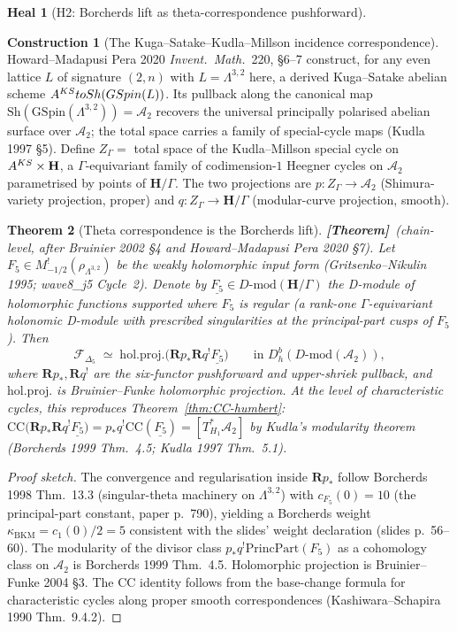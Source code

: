 \documentclass[11pt]{amsart}
\newtheorem{theorem}{Theorem}
\theoremstyle{definition}
\newtheorem{heal}[attack]{Heal}
\newtheorem{construction}[theorem]{Construction}
\providecommand{\kBKM}{\kappa_{\mathrm{BKM}}}
\providecommand{\DMod}{D\text{-}\mathrm{mod}}
\providecommand{\Sh}{\mathrm{Sh}}
\providecommand{\GSpin}{\mathrm{GSpin}}
\providecommand{\cF}{\mathcal{F}}
\providecommand{\bR}{\mathbf{R}}
\providecommand{\bH}{\mathbf{H}}
\providecommand{\PrincPart}{\mathrm{PrincPart}}
\providecommand{\holproj}{\mathrm{hol.proj.}}
\providecommand{\Dfive}{\Delta_5}
\providecommand{\CharCyc}{\mathrm{CC}}
\providecommand{\ClaimStatusTheorem}{\textbf{[Theorem]}}
\begin{document}
\begin{heal}[H2: Borcherds lift as theta-correspondence pushforward]
\leavevmode

\begin{construction}[The Kuga--Satake--Kudla--Millson incidence
correspondence]\label{constr:kuga-satake}
Howard--Madapusi Pera 2020 \emph{Invent.\ Math.}~220, \S6--7
construct, for any even lattice $L$ of signature $(2, n)$ with
$L = \Lambda^{3,2}$ here, a derived Kuga--Satake abelian scheme
$A^{\rm KS} \to \Sh(\GSpin(L))$. Its pullback along the canonical
map $\Sh(\GSpin(\Lambda^{3,2})) = \mathcal{A}_2$ recovers the
universal principally polarised abelian surface over
$\mathcal{A}_2$; the total space carries a family of special-cycle
maps (Kudla 1997 \S 5). Define
$Z_\Gamma = $ total space of the Kudla--Millson special cycle on
$A^{\rm KS} \times \bH$, a $\Gamma$-equivariant family of
codimension-$1$ Heegner cycles on $\mathcal{A}_2$ parametrised by
points of $\bH / \Gamma$. The two projections are
$p \colon Z_\Gamma \to \mathcal{A}_2$ (Shimura-variety projection,
proper) and $q \colon Z_\Gamma \to \bH/\Gamma$ (modular-curve
projection, smooth).
\end{construction}

\begin{theorem}[Theta correspondence is the Borcherds lift]
\label{thm:theta-lift-sheaf}
\ClaimStatusTheorem\ (chain-level, after Bruinier 2002 \S 4 and
Howard--Madapusi Pera 2020 \S 7).  Let
$F_5 \in M^!_{-1/2}(\rho_{\Lambda^{3,2}})$ be the weakly holomorphic
input form (Gritsenko--Nikulin 1995; wave8\_j5 Cycle~2). Denote by
$\underline{F_5} \in \DMod(\bH/\Gamma)$ the D-module of holomorphic
functions supported where $F_5$ is regular (a rank-one
$\Gamma$-equivariant holonomic D-module with prescribed singularities
at the principal-part cusps of $F_5$). Then
\[
 \cF_{\Dfive}
 \;\simeq\;
 \holproj \bigl(\bR p_* \bR q^! \underline{F_5}\bigr)
 \qquad\text{in } D^b_h(\DMod(\mathcal{A}_2)),
\]
where $\bR p_*, \bR q^!$ are the six-functor pushforward and upper-shriek
pullback, and $\holproj$ is Bruinier--Funke holomorphic projection.
At the level of characteristic cycles, this reproduces
Theorem~\ref{thm:CC-humbert}: $\CharCyc\bigl(\bR p_* \bR q^!
\underline{F_5}\bigr) = p_*q^!\CharCyc(\underline{F_5}) =
[T^*_{H_1}\mathcal{A}_2]$ by Kudla's modularity theorem
(Borcherds 1999 Thm.~4.5; Kudla 1997 Thm.~5.1).
\end{theorem}

\begin{proof}[Proof sketch]
The convergence and regularisation inside $\bR p_*$ follow Borcherds
1998 Thm.~13.3 (singular-theta machinery on $\Lambda^{3,2}$) with
$c_{F_5}(0) = 10$ (the principal-part constant, paper p.~790),
yielding a Borcherds weight $\kBKM = c_1(0)/2 = 5$ consistent with the
slides' weight declaration (slides p.~56--60). The modularity of the
divisor class $p_*q^!\PrincPart(F_5)$ as a cohomology class on
$\mathcal{A}_2$ is Borcherds 1999 Thm.~4.5. Holomorphic projection is
Bruinier--Funke 2004 \S 3. The CC identity follows from the
base-change formula for characteristic cycles along proper smooth
correspondences (Kashiwara--Schapira 1990 Thm.~9.4.2).
\end{proof}


\end{heal}
\end{document}
